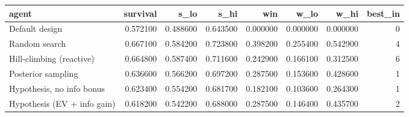 \begin{tabular}{lrrrrrrr}
\toprule
agent & survival & s\_lo & s\_hi & win & w\_lo & w\_hi & best\_in \\
\midrule
Default design & 0.572100 & 0.488600 & 0.643500 & 0.000000 & 0.000000 & 0.000000 & 0 \\
Random search & 0.667100 & 0.584200 & 0.723800 & 0.398200 & 0.255400 & 0.542900 & 4 \\
Hill-climbing (reactive) & 0.664800 & 0.587400 & 0.711600 & 0.242900 & 0.166100 & 0.312500 & 6 \\
Posterior sampling & 0.636600 & 0.566200 & 0.697200 & 0.287500 & 0.153600 & 0.428600 & 1 \\
Hypothesis, no info bonus & 0.623400 & 0.554200 & 0.681700 & 0.182100 & 0.103600 & 0.264300 & 1 \\
Hypothesis (EV + info gain) & 0.618200 & 0.542200 & 0.688000 & 0.287500 & 0.146400 & 0.435700 & 2 \\
\bottomrule
\end{tabular}
